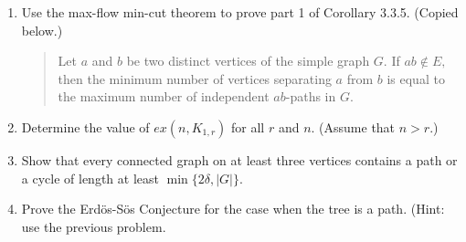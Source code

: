\documentclass[12pt]{article}
\begin{document}
\begin{enumerate}
\item Use the max-flow min-cut theorem to prove part 1 of Corollary 3.3.5. (Copied below.)\\

\begin{quote}
Let $a$ and $b$ be two distinct vertices of the simple graph $G$. If $ab \not \in E,$ then the minimum number of vertices separating $a$ from $b$ is equal to the maximum number of independent $ab$-paths in $G.$
\end{quote}

\item Determine the value of $ex(n,K_{1,r})$ for all $r$ and $n$. (Assume that $n>r.$)
\item Show that every connected graph on at least three vertices contains a path or a cycle of length at least $\min\{2\delta, |G|\}.$
\item Prove the Erd\"{o}s-S\"os Conjecture for the case when the tree is a path. (Hint: use the previous problem.
\end{enumerate}
\end{document}
